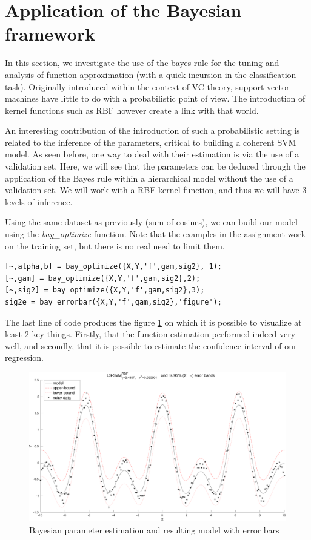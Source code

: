 \documentclass[11pt, a4paper]{article}
\begin{document}
\section{Application of the Bayesian framework}

In this section, we investigate the use of the bayes rule for the
tuning and analysis of function approximation (with a quick incursion
in the classification task). Originally introduced within the context
of VC-theory, support vector machines have little to do with a
probabilistic point of view. The introduction of kernel functions such
as RBF however create a link with that world.

An interesting contribution of the introduction of such a
probabilistic setting is related to the inference of the parameters,
critical to building a coherent SVM model. As seen before, one way to
deal with their estimation is via the use of a validation set. Here,
we will see that the parameters can be deduced through the application
of the Bayes rule within a hierarchical model without the use of a
validation set. We will work with a RBF kernel function, and thus we
will have 3 levels of inference.

Using the same dataset as previously (sum of cosines), we can build
our model using the \emph{bay\_optimize} function. Note that the
examples in the assignment work on the training set, but there is no
real need to limit them. 

\begin{lstlisting}
[~,alpha,b] = bay_optimize({X,Y,'f',gam,sig2}, 1);
[~,gam] = bay_optimize({X,Y,'f',gam,sig2},2);
[~,sig2] = bay_optimize({X,Y,'f',gam,sig2},3);
sig2e = bay_errorbar({X,Y,'f',gam,sig2},'figure');
\end{lstlisting}

The last line of code produces the figure \ref{fig:sumcos_bay1} on
which it is possible to visualize at least 2 key things. Firstly, that
the function estimation performed indeed very well, and secondly, that
it is possible to estimate the confidence interval of our regression.

\begin{figure}[H]
  \vspace{-20pt}
    \centering
    \includegraphics[scale=.40]{sumcos_bay1.pdf}
    \caption{Bayesian parameter estimation and resulting model with error bars}
    \label{fig:sumcos_bay1}
\end{figure}
\end{document}
